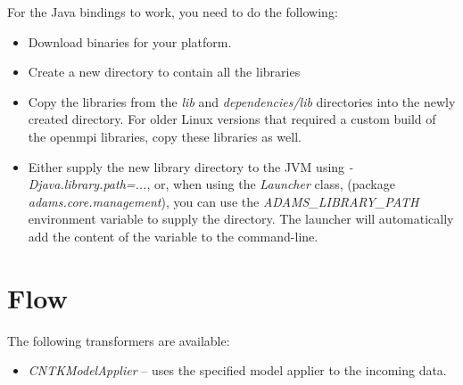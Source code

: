 \documentclass[a4paper]{book}
\begin{document}
\noindent For the Java bindings to work, you need to do the following:
\begin{itemize}
  \item Download binaries for your platform.
  \item Create a new directory to contain all the libraries
  \item Copy the libraries from the \textit{lib} and \textit{dependencies/lib}
  directories into the newly created directory. For older Linux versions that
  required a custom build of the openmpi libraries, copy these libraries as well.
  \item Either supply the new library directory to the JVM using
  \textit{-Djava.library.path=...}, or, when using the \textit{Launcher} class,
  (package \textit{adams.core.management}), you can use the
  \textit{ADAMS\_LIBRARY\_PATH} environment variable to supply the directory.
  The launcher will automatically add the content of the variable to the
  command-line.
\end{itemize}


\chapter{Flow}
The following transformers are available:
\begin{itemize}
  \item \textit{CNTKModelApplier} -- uses the specified model applier to the
  incoming data.
\end{itemize}



\end{document}
